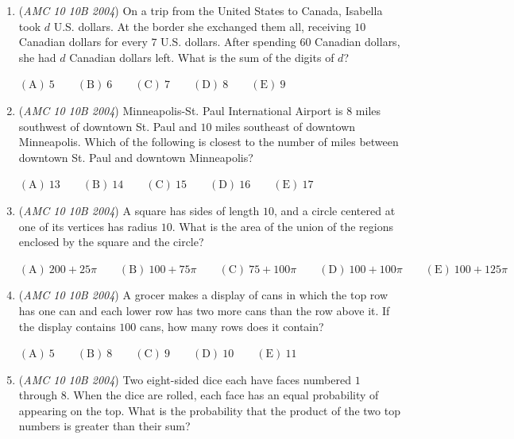 \begin{enumerate}
 $\noindent \textbf{(A)}\ 98! \cdot 99! \qquad \textbf{(B)}\ 98! \cdot 100! \qquad \textbf{(C)}\ 99! \cdot 100! \qquad \textbf{(D)}\ 99! \cdot 101! \qquad \textbf{(E)}\ 100! \cdot 101!$


	\item (\textit{AMC 10 10B 2004}) On a trip from the United States to Canada, Isabella took $d$ U.S. dollars. At the border she exchanged them all, receiving $10$ Canadian dollars for every $7$ U.S. dollars. After spending $60$ Canadian dollars, she had $d$ Canadian dollars left. What is the sum of the digits of $d$?


 $\mathrm{(A) \ } 5 \qquad \mathrm{(B) \ } 6\qquad \mathrm{(C) \ } 7\qquad \mathrm{(D) \ } 8\qquad \mathrm{(E) \ } 9$


	\item (\textit{AMC 10 10B 2004}) Minneapolis-St. Paul International Airport is $8$ miles southwest of downtown St. Paul and $10$ miles southeast of downtown Minneapolis. Which of the following is closest to the number of miles between downtown St. Paul and downtown Minneapolis?


 $\mathrm{(A) \ } 13 \qquad \mathrm{(B) \ } 14\qquad \mathrm{(C) \ } 15\qquad \mathrm{(D) \ } 16\qquad \mathrm{(E) \ } 17$


	\item (\textit{AMC 10 10B 2004}) A square has sides of length $10$, and a circle centered at one of its vertices has radius $10$. What is the area of the union of the regions enclosed by the square and the circle?


 $\mathrm{(A) \ } 200+25\pi \qquad \mathrm{(B) \ } 100+75\pi \qquad \mathrm{(C) \ } 75+100\pi \qquad \mathrm{(D) \ } 100+100\pi \qquad \mathrm{(E) \ } 100+125\pi$


	\item (\textit{AMC 10 10B 2004}) A grocer makes a display of cans in which the top row has one can and each lower row has two more cans than the row above it. If the display contains $100$ cans, how many rows does it contain?


 $\mathrm{(A) \ } 5 \qquad \mathrm{(B) \ } 8 \qquad \mathrm{(C) \ } 9 \qquad \mathrm{(D) \ } 10\qquad \mathrm{(E) \ } 11$


	\item (\textit{AMC 10 10B 2004}) Two eight-sided dice each have faces numbered $1$ through $8$. When the dice are rolled, each face has an equal probability of appearing on the top. What is the probability that the product of the two top numbers is greater than their sum?



\end{enumerate}
